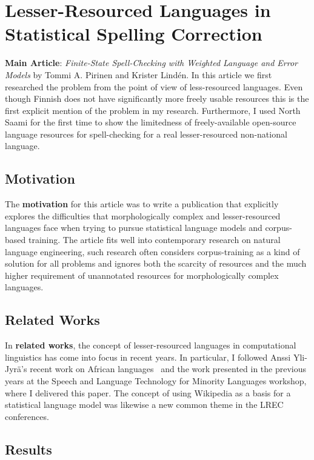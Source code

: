 \documentclass[officiallayout,final]{unihelcompling}
\begin{document}
\section{Lesser-Resourced Languages in Statistical Spelling Correction}
\label{sec:lesser-training}

\textbf{Main Article}: \emph{Finite-State Spell-Checking with Weighted Language
and Error Models} by Tommi A. Pirinen and Krister Lindén. In this article we
first researched the problem from the point of view of less-resourced
languages. Even though Finnish does not have significantly more freely usable
resources this is the first explicit mention of the problem in my research.
Furthermore, I used North Saami for the first time to show the limitedness of
freely-available open-source language resources for spell-checking for a real
lesser-resourced non-national language.

\subsection{Motivation}

The \textbf{motivation} for this article was to write a publication that
explicitly explores the difficulties that morphologically complex and
lesser-resourced languages face when trying to pursue statistical language
models and corpus-based training. The article fits well into contemporary
research on natural language engineering, such research often considers
corpus-training as a kind of solution for all problems and ignores both the
scarcity of resources and the much higher requirement of unannotated resources
for morphologically complex languages.

\subsection{Related Works}

In \textbf{related works}, the concept of lesser-resourced languages in
computational linguistics has come into focus in recent years. In particular, I
followed Anssi Yli-Jyrä's recent work on African
languages~\citep{yli2005toward} and the work presented in the previous years at
the Speech and Language Technology for Minority Languages workshop, where I
delivered this paper.  The concept of using Wikipedia as a basis for a
statistical language model was likewise a new common theme in the LREC
conferences.

\subsection{Results}
\end{document}
